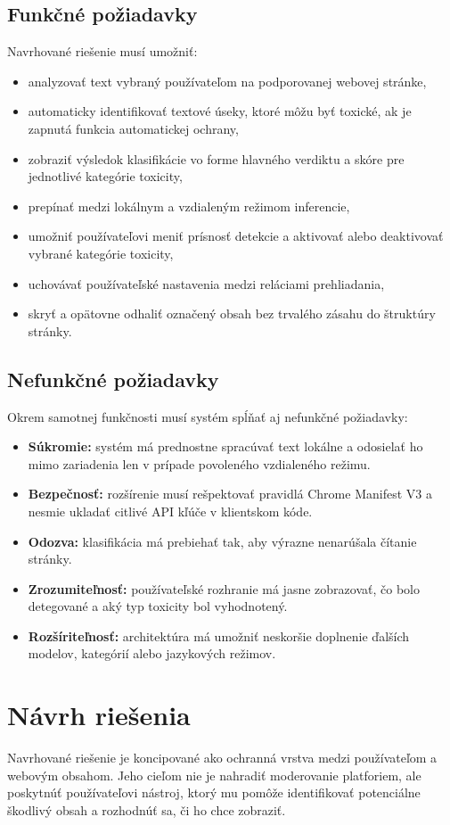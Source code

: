 \subsection{Funkčné požiadavky}
Navrhované riešenie musí umožniť:
\begin{itemize}
  \item analyzovať text vybraný používateľom na podporovanej webovej stránke,
  \item automaticky identifikovať textové úseky, ktoré môžu byť toxické, ak je zapnutá funkcia automatickej ochrany,
  \item zobraziť výsledok klasifikácie vo forme hlavného verdiktu a skóre pre jednotlivé kategórie toxicity,
  \item prepínať medzi lokálnym a vzdialeným režimom inferencie,
  \item umožniť používateľovi meniť prísnosť detekcie a aktivovať alebo deaktivovať vybrané kategórie toxicity,
  \item uchovávať používateľské nastavenia medzi reláciami prehliadania,
  \item skryť a opätovne odhaliť označený obsah bez trvalého zásahu do štruktúry stránky.
\end{itemize}

\subsection{Nefunkčné požiadavky}
Okrem samotnej funkčnosti musí systém spĺňať aj nefunkčné požiadavky:
\begin{itemize}
  \item \textbf{Súkromie:} systém má prednostne spracúvať text lokálne a odosielať ho mimo zariadenia len v prípade povoleného vzdialeného režimu.
  \item \textbf{Bezpečnosť:} rozšírenie musí rešpektovať pravidlá Chrome Manifest V3 a nesmie ukladať citlivé API kľúče v klientskom kóde.
  \item \textbf{Odozva:} klasifikácia má prebiehať tak, aby výrazne nenarúšala čítanie stránky.
  \item \textbf{Zrozumiteľnosť:} používateľské rozhranie má jasne zobrazovať, čo bolo detegované a aký typ toxicity bol vyhodnotený.
  \item \textbf{Rozšíriteľnosť:} architektúra má umožniť neskoršie doplnenie ďalších modelov, kategórií alebo jazykových režimov.
\end{itemize}

\section{Návrh riešenia}
Navrhované riešenie je koncipované ako ochranná vrstva medzi používateľom a webovým obsahom. Jeho cieľom nie je nahradiť moderovanie platforiem, ale poskytnúť používateľovi nástroj, ktorý mu pomôže identifikovať potenciálne škodlivý obsah a rozhodnúť sa, či ho chce zobraziť.

